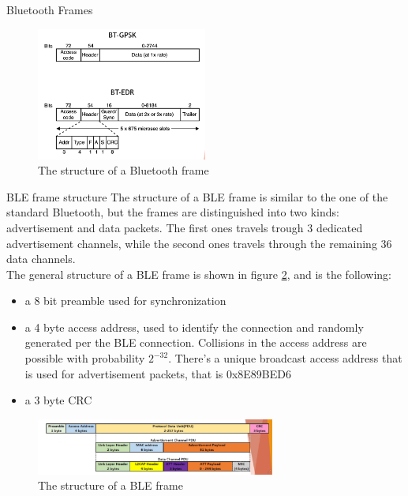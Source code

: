 \begin{section}{Bluetooth Frames}
  \begin{figure}[H]
    \centering
    \includegraphics[width=0.5\textwidth]{img/wireless/bluetooth frame.png}
    \caption{The structure of a Bluetooth frame}
    \label{fig:bluetooth frame}
  \end{figure}
  \begin{subsection}{BLE frame structure}
    The structure of a BLE frame is similar to the one of the standard Bluetooth, but the frames are
    distinguished into two kinds: advertisement and data packets. The first ones travels trough 3
    dedicated advertisement channels, while the second ones travels through the remaining 36 data
    channels.\\
    The general structure of a BLE frame is shown in figure \ref{fig:ble frame}, and is the
    following:
    \begin{itemize}
      \item a 8 bit preamble used for synchronization
      \item a 4 byte access address, used to identify the connection and randomly generated per the
        BLE connection. Collisions in the access address are possible with probability $2^{-32}$.
        There's a unique broadcast access address that is used for advertisement packets, that is
        0x8E89BED6
      \item a 3 byte CRC
    \end{itemize}
    \begin{figure}[H]
      \centering
      \includegraphics[width=0.7\textwidth]{img/wireless/BLE frame.png}
      \caption{The structure of a BLE frame}
      \label{fig:ble frame}
    \end{figure}
  \end{subsection}
  

\end{section}
